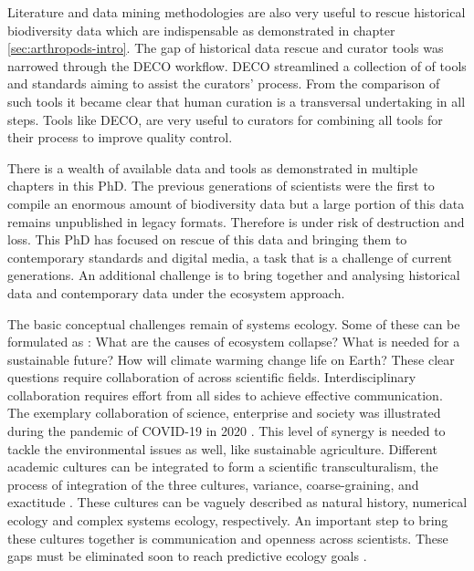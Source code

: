 Literature and data mining 
methodologies are also very useful to rescue historical biodiversity data which are
indispensable as demonstrated in chapter \ref{sec:arthropods-intro}.
The gap of historical data rescue and curator tools was narrowed
through the DECO workflow. DECO streamlined a collection of 
of tools and standards aiming to assist the curators' process. From the comparison
of such tools it became clear that human curation is a transversal undertaking in all steps.
Tools like DECO, are very useful to curators for combining all tools for their process 
to improve quality control.

There is a wealth of available data and tools as demonstrated in 
multiple chapters in this PhD. 
The previous generations of scientists were the first to 
compile an enormous amount of biodiversity data but a large portion
of this data remains unpublished in legacy formats. Therefore is under risk of destruction and loss.
This PhD has focused on rescue of this data and bringing them to contemporary standards and digital media,
a task that is a challenge of current generations. 
An additional challenge is to bring together and analysing historical data
and contemporary data under the ecosystem approach.

The basic conceptual challenges remain of systems ecology. 
Some of these can be formulated as : What are the causes of ecosystem collapse?
What is needed for a sustainable future?
How will climate warming change life on Earth?
These clear questions require collaboration of across scientific fields. 
Interdisciplinary collaboration requires effort from all sides to 
achieve effective communication. 
The exemplary collaboration of science, enterprise and society was
illustrated during the pandemic of COVID-19 in 2020 \parencite{ioannidis2021the-rapid,lee2021scientific}. 
This level of synergy is needed to tackle the environmental issues
as well, like sustainable agriculture.
Different academic cultures can be integrated to form a scientific transculturalism,
the process of integration of the three cultures, variance, coarse-graining, and exactitude \parencite{Enquist_2024}.
These cultures can be vaguely described as natural history, numerical ecology and complex systems ecology, respectively.
An important step to bring these cultures together is communication and openness across scientists.
These gaps must be eliminated soon to reach predictive ecology goals \parencite{mouquet_review_2015}.

